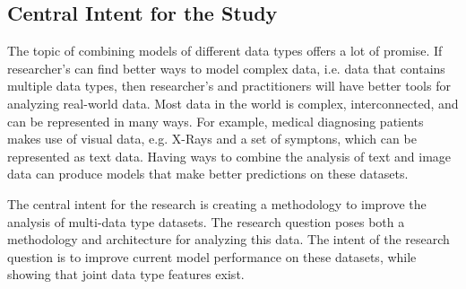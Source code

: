 \subsection{Central Intent for the Study}

The topic of combining models of different data types offers a lot of promise.  If researcher's can find better ways to model complex data, i.e. data that contains multiple data types, then researcher's and practitioners will have better tools for analyzing real-world data.  Most data in the world is complex, interconnected, and can be represented in many ways.  For example, medical diagnosing patients makes use of visual data, e.g. X-Rays and a set of symptons, which can be represented as text data.  Having ways to combine the analysis of text and image data can produce models that make better predictions on these datasets. %

The central intent for the research is creating a methodology to improve the analysis of multi-data type datasets.  The research question poses both a methodology and architecture for analyzing this data.  The intent of the research question is to improve current model performance on these datasets, while showing that joint data type features exist.


